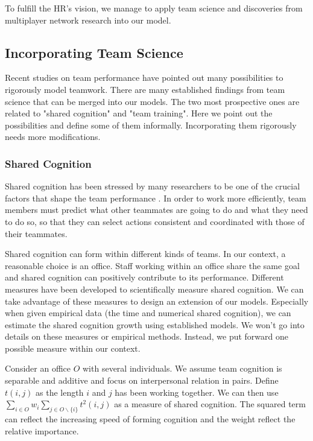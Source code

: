\documentclass[tcn = 37075, sheet = false, abstract = false]{mcmthesis}
\begin{document}
	To fulfill the HR's vision, we manage to apply team science and discoveries from multiplayer network research into our model.
	
	\subsection{Incorporating Team Science}
	
	Recent studies on team performance have pointed out many possibilities to rigorously model teamwork\cite{salas2008teams}. There are many established findings from team science that can be merged into our models. The two most prospective ones are related to "shared cognition" and "team training". Here we point out the possibilities and define some of them informally. Incorporating them rigorously needs more modifications.
	
	\subsubsection{Shared Cognition}
	
	Shared cognition has been stressed by many researchers to be one of the crucial factors that shape the team performance \cite{cannon2001reflections}. In order to work more efficiently, team members must predict what other teammates are going to do and what they need to do so, so that they can select actions consistent and coordinated with those of their teammates. \cite{mathieu2000influence}
	
	Shared cognition can form within different kinds of teams. In our context, a reasonable choice is an office. Staff working within an office share the same goal and shared cognition can positively contribute to its performance. Different measures have been developed to scientifically measure shared cognition\cite{cannon2001reflections}. We can take advantage of these measures to design an extension of our models. Especially when given empirical data (the time and numerical shared cognition), we can estimate the shared cognition growth using established models. We won't go into details on these measures or empirical methods. Instead, we put forward one possible measure within our context.
	
	Consider an office $O$ with several individuals. We assume team cognition is separable and additive and focus on interpersonal relation in pairs. Define $t(i,j)$ as the length $i$ and $j$ has been working together. We can then use $\sum\limits_{i\in O}w_i\sum\limits_{j\in O\backslash \{i\}}t^2(i,j)$ as a measure of shared cognition. The squared term can reflect the increasing speed of forming cognition and the weight reflect the relative importance.
	
\end{document}
